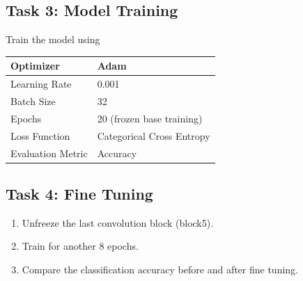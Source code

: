 \documentclass[11pt]{article}
\begin{document}

\subsection*{Task 3: Model Training}

Train the model using

\begin{center}

\begin{tabular}{|p{5cm}|p{6cm}|}

\hline

Optimizer & Adam\\

\hline

Learning Rate & 0.001\\

\hline

Batch Size & 32\\

\hline

Epochs & 20 (frozen base training)\\

\hline

Loss Function &
Categorical Cross Entropy\\

\hline

Evaluation Metric &
Accuracy\\

\hline

\end{tabular}

\end{center}


\subsection*{Task 4: Fine Tuning}

\begin{enumerate}

\item Unfreeze the last convolution block (block5).

\item Train for another 8 epochs.

\item Compare the classification accuracy before and after fine tuning.

\end{enumerate}
\end{document}

